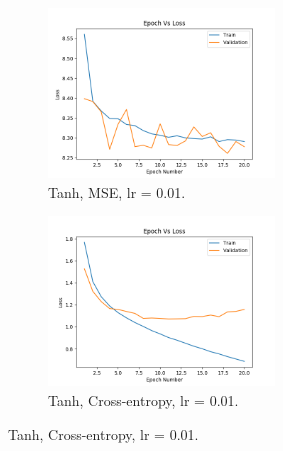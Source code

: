 \documentclass[12pt]{article}
\begin{document}
\begin{figure}
\begin{framed}
				\begin{subfigure}{5.5cm}
					\centering
					\includegraphics[width=6cm]{../Images/Epoch_VS_Loss/Tanh_MSE_001.png}
					\captionsetup{justification=centering,margin=1cm}
					\caption{Tanh, MSE, lr = 0.01.}
					\label{fig:sub9}
				\end{subfigure}
				\begin{subfigure}{5.5cm}
					\centering
					\includegraphics[width=6cm]{../Images/Epoch_VS_Loss/Tanh_cross-entropy_001.png}
					\captionsetup{justification=centering,margin=.6cm}
					\caption{Tanh, Cross-entropy, lr = 0.01.}
					\label{fig:sub10}
				\end{subfigure}%
			

\end{framed}
\end{figure}
\end{document}
